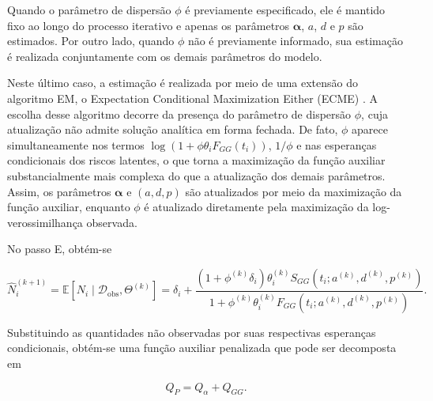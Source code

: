 Quando o parâmetro de dispersão \(\phi\) é previamente especificado, ele é mantido fixo ao
longo do processo iterativo e apenas os parâmetros \(\boldsymbol{\alpha}\), \(a\), \(d\) e \(p\) são estimados.
Por outro lado, quando \(\phi\) não é previamente informado, sua estimação é realizada conjuntamente com os
demais parâmetros do modelo.

Neste último caso, a estimação é realizada por meio de uma extensão do algoritmo EM, o
Expectation Conditional Maximization Either (ECME) \cite{mclachlan2008algorithm}. A escolha desse
algoritmo decorre da presença do parâmetro de dispersão \(\phi\), cuja
atualização não admite solução analítica em forma fechada. De fato,
\(\phi\) aparece simultaneamente nos termos \(\log(1+\phi\theta_iF_{GG}(t_i))\), \(1/\phi\) e nas
esperanças condicionais dos riscos latentes, o que torna a maximização da função auxiliar substancialmente
mais complexa do que a atualização dos demais parâmetros. Assim, os parâmetros \(\boldsymbol{\alpha}\)
e \((a,d,p)\) são atualizados por meio da maximização da função auxiliar, enquanto \(\phi\) é atualizado
diretamente pela maximização da log-verossimilhança observada.


No passo E, obtém-se

\begin{equation}
\widehat N_i^{(k+1)}
=
\mathbb{E}
\!\left[
N_i
\mid
\mathcal D_{\mathrm{obs}},
\Theta^{(k)}
\right]
=
\delta_i
+
\frac{
\left(
1+\phi^{(k)}\delta_i
\right)
\theta_i^{(k)}
S_{GG}
\!\left(
t_i;
a^{(k)},
d^{(k)},
p^{(k)}
\right)
}{
1+
\phi^{(k)}
\theta_i^{(k)}
F_{GG}
\!\left(
t_i;
a^{(k)},
d^{(k)},
p^{(k)}
\right)
}.
\end{equation}

Substituindo as quantidades não observadas por suas respectivas esperanças condicionais, obtém-se uma
função auxiliar penalizada que pode ser decomposta em

\begin{equation}
Q_P
=
Q_{\alpha}
+
Q_{GG}.
\end{equation}

